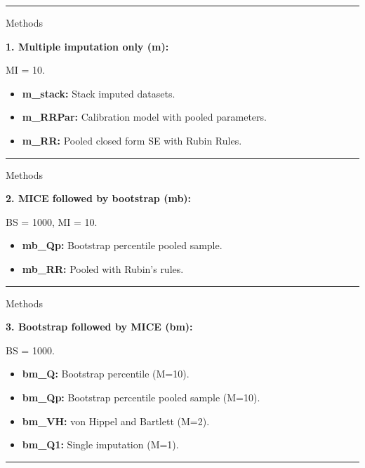 \documentclass[
  letterpaper,
  DIV=11,
  numbers=noendperiod]{scrartcl}
\begin{document}
\begin{center}\rule{0.5\linewidth}{0.5pt}\end{center}

{ Methods}

\textbf{1. Multiple imputation only (m):}

{ MI = 10.}

\begin{itemize}
\item
  \textbf{m\_stack:} Stack imputed datasets.
\item
  \textbf{m\_RRPar:} Calibration model with pooled parameters.
\item
  \textbf{m\_RR:} Pooled closed form SE with Rubin Rules.
\end{itemize}

\begin{center}\rule{0.5\linewidth}{0.5pt}\end{center}

{ Methods}

\textbf{2. MICE followed by bootstrap (mb):}

{ BS = 1000, MI = 10.}

\begin{itemize}
\item
  \textbf{mb\_Qp:} Bootstrap percentile pooled sample.
\item
  \textbf{mb\_RR:} Pooled with Rubin's rules.
\end{itemize}

\begin{center}\rule{0.5\linewidth}{0.5pt}\end{center}

{ Methods}

\textbf{3. Bootstrap followed by MICE (bm):}

{ BS = 1000.}

\begin{itemize}
\item
  \textbf{bm\_Q:} Bootstrap percentile (M=10).
\item
  \textbf{bm\_Qp:} Bootstrap percentile pooled sample (M=10).
\item
  \textbf{bm\_VH:} von Hippel and Bartlett (M=2).
\item
  \textbf{bm\_Q1:} Single imputation (M=1).
\end{itemize}

\begin{center}\rule{0.5\linewidth}{0.5pt}\end{center}
\end{document}
